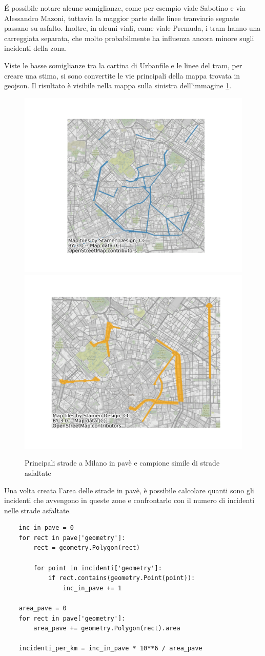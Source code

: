\documentclass[a4paper,12pt]{report}
\begin{document}
\'E possibile notare alcune somiglianze, come per esempio viale Sabotino e via 
Alessandro Mazoni, tuttavia la maggior parte delle linee tranviarie segnate 
passano su asfalto.
Inoltre, in alcuni viali, come viale Premuda, i tram hanno una carreggiata separata, 
che molto probabilmente ha influenza ancora minore sugli incidenti della zona.

Viste le basse somiglianze tra la cartina di Urbanfile e le linee del tram, 
per creare una stima, si sono convertite le vie principali della mappa trovata 
in geojson. 
Il risultato è visibile nella mappa sulla sinistra dell'immagine \ref{fig:mappa-pave}.

\begin{figure}
    \includegraphics[width=0.5\linewidth]{../src/pave/mappa_pave.png}
    \includegraphics[width=0.5\linewidth]{../src/pave/mappa_asfalto.png}
    \caption{Principali strade a Milano in pavè e campione simile di strade asfaltate}
    \label{fig:mappa-pave}
\end{figure}

Una volta creata l'area delle strade in pavè, è possibile calcolare quanti sono gli 
incidenti che avvengono in queste zone e confrontarlo con il numero di incidenti 
nelle strade asfaltate.

\begin{lstlisting}
    inc_in_pave = 0
    for rect in pave['geometry']: 
        rect = geometry.Polygon(rect)

        for point in incidenti['geometry']: 
            if rect.contains(geometry.Point(point)): 
                inc_in_pave += 1

    area_pave = 0
    for rect in pave['geometry']: 
        area_pave += geometry.Polygon(rect).area

    incidenti_per_km = inc_in_pave * 10**6 / area_pave
\end{lstlisting}
\end{document}
